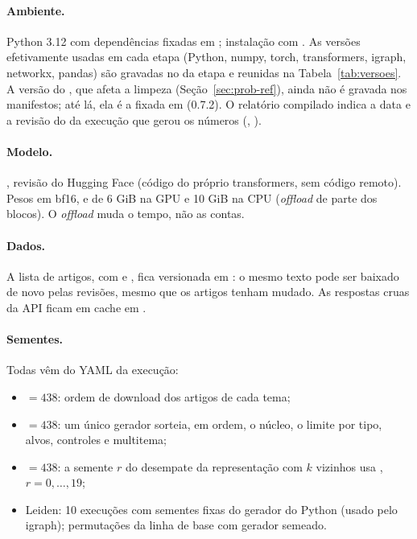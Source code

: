 \paragraph{Ambiente.} Python 3.12 com dependências fixadas em ; instalação com
. As versões efetivamente usadas em cada etapa (Python, numpy, torch, transformers,
igraph, networkx, pandas) são gravadas no  da etapa e
reunidas na Tabela~\ref{tab:versoes}. A versão do , que afeta a
limpeza (Seção~\ref{sec:prob-ref}), ainda não é gravada nos manifestos; até lá, ela é a fixada
em  (0.7.2). O relatório compilado indica a data e a revisão do
 da execução que gerou os números (\dataExecucao, \revisaoGit).

\paragraph{Modelo.} , revisão
 do Hugging Face (código do próprio transformers, sem código remoto).
Pesos em bf16,  e  de 6 GiB na GPU e 10 GiB na CPU
(\emph{offload} de parte dos blocos). O \emph{offload} muda o tempo, não as contas.

\paragraph{Dados.} A lista de artigos, com  e , fica versionada em
: o mesmo texto pode ser baixado de novo pelas revisões, mesmo
que os artigos tenham mudado. As respostas cruas da API ficam em cache em .

\paragraph{Sementes.} Todas vêm do YAML da execução:
\begin{itemize}
    \item {} $=438$: ordem de download dos artigos de cada tema;
    \item {} $=438$: um único gerador sorteia, em ordem, o núcleo, o limite por
    tipo, alvos, controles e multitema;
    \item {} $=438$: a semente $r$ do desempate da representação
     com $k$ vizinhos usa ,
    $r=0,\ldots,19$;
    \item Leiden: 10 execuções com sementes fixas do gerador  do Python (usado pelo
    igraph); permutações da linha de base com gerador semeado.
\end{itemize}


